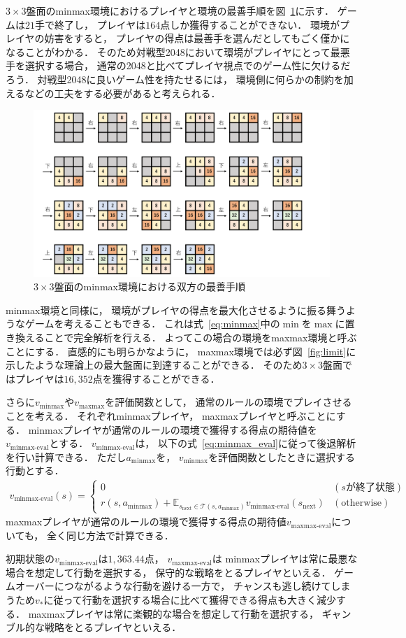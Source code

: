 $3\times3$盤面のminmax環境におけるプレイヤと環境の最善手順を図~\ref{fig:minmax_env}に示す．
ゲームは$21$手で終了し， プレイヤは$164$点しか獲得することができない．
環境がプレイヤの妨害をすると， プレイヤの得点は最善手を選んだとしてもごく僅かになることがわかる．
そのため対戦型2048において環境がプレイヤにとって最悪手を選択する場合， 通常の2048と比べてプレイヤ視点でのゲーム性に欠けるだろう．
対戦型2048に良いゲーム性を持たせるには， 環境側に何らかの制約を加えるなどの工夫をする必要があると考えられる．
\begin{figure}[t]
    \centering
    \includegraphics[width=\linewidth{}]{figures/minmax_transition.pdf}
    \caption{$3\times3$盤面のminmax環境における双方の最善手順}
    \label{fig:minmax_env}
\end{figure}

minmax環境と同様に， 環境がプレイヤの得点を最大化させるように振る舞うようなゲームを考えることもできる．
これは式~\ref{eq:minmax}中の$\min$を$\max$に置き換えることで完全解析を行える．
よってこの場合の環境をmaxmax環境と呼ぶことにする．
直感的にも明らかなように， maxmax環境では必ず図~\ref{fig:limit}に示したような理論上の最大盤面に到達することができる．
そのため$3\times3$盤面ではプレイヤは$16,352$点を獲得することができる．

さらに$v_{\text{minmax}}$や$v_{\text{maxmax}}$を評価関数として， 通常のルールの環境でプレイさせることを考える．
それぞれminmaxプレイヤ， maxmaxプレイヤと呼ぶことにする．
minmaxプレイヤが通常のルールの環境で獲得する得点の期待値を$v_{\text{minmax-eval}}$とする．
$v_{\text{minmax-eval}}$は， 以下の式~\ref{eq:minmax_eval}に従って後退解析を行い計算できる．
ただし$a_{\text{minmax}}$を， $v_{\text{minmax}}$を評価関数としたときに選択する行動とする．
\begin{align}
    v_{\text{minmax-eval}}(s) =
    \begin{cases}
        0 & (s \text{が終了状態}) \\
        r(s, a_{\text{minmax}}) + \mathbb{E}_{s_\text{next} \in \mathcal{T}(s, a_{\text{minmax}})} v_{\text{minmax-eval}}(s_\text{next}) & (\text{otherwise})
    \end{cases}
    \label{eq:minmax_eval}
\end{align}
maxmaxプレイヤが通常のルールの環境で獲得する得点の期待値$v_{\text{maxmax-eval}}$についても， 全く同じ方法で計算できる．

初期状態の$v_{\text{minmax-eval}}$は$1,363.44$点， $v_{\text{maxmax-eval}}$は
minmaxプレイヤは常に最悪な場合を想定して行動を選択する， 保守的な戦略をとるプレイヤといえる．
ゲームオーバーにつながるような行動を避ける一方で， チャンスも逃し続けてしまうため$v_*$に従って行動を選択する場合に比べて獲得できる得点も大きく減少する．
maxmaxプレイヤは常に楽観的な場合を想定して行動を選択する， ギャンブル的な戦略をとるプレイヤといえる．
